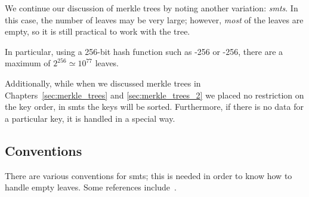 We continue our discussion of \glspl{merkle tree} by noting
another variation: \emph{\glspl{smt}}.
In this case, the number of leaves may be very large;
however, \emph{most} of the leaves are empty,
so it is still practical to work with the tree.

In particular, using a 256-bit \gls{hash function} such as
\ShaTwo{}-256 or \ShaThree{}-256,
there are a maximum of $2^{256}\simeq 10^{77}$ leaves.

Additionally, while when we discussed \glspl{merkle tree} in
Chapters~\ref{sec:merkle_trees} and \ref{sec:merkle_trees_2}
we placed no restriction on the key order,
in \glspl{smt} the keys will be sorted.
Furthermore, if there is no data for a particular key,
it is handled in a special way.

\subsection{Conventions}

There are various conventions for \glspl{smt};
this is needed in order to know how to handle empty leaves.
Some references include~\cite{EfficientSMT,CompactSMT,CompactMerkleMultiproofs,
RevocationTransparency2012,AngelaSMT}.
